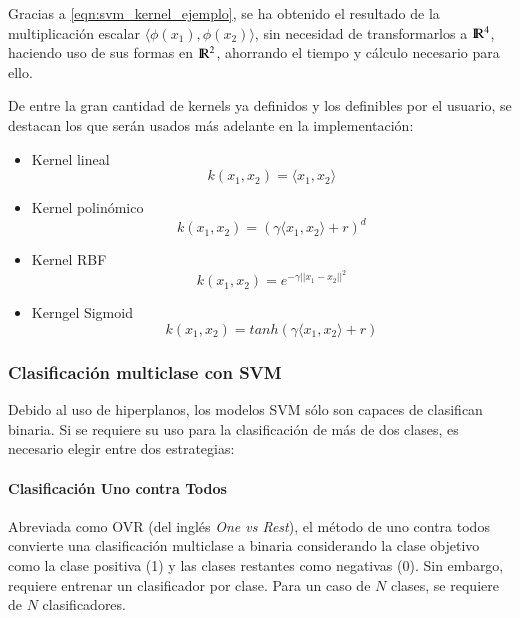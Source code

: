 Gracias a \ref{eqn:svm_kernel_ejemplo}, se ha obtenido el resultado de la multiplicación escalar $\langle \phi(x_{1}),\phi(x_{2})\rangle$, sin necesidad de transformarlos a $\rm I\!R^{4}$, haciendo uso de sus formas en $\rm I\!R^{2}$, ahorrando el tiempo y cálculo necesario para ello.

De entre la gran cantidad de kernels ya definidos y los definibles por el usuario, se destacan los que serán usados más adelante en la implementación:

\begin{itemize}
	\item Kernel lineal 
		\begin{equation}
			k(x_{1},x_{2}) = \langle x_{1},x_{2}\rangle
			\label{eqn:svm_kernel_lineal}
		\end{equation}	
	\item Kernel polinómico 
		\begin{equation}
			k(x_{1},x_{2}) = (\gamma\langle x_{1},x_{2}\rangle+r)^{d}
			\label{eqn:svm_kernel_poly}
		\end{equation}
	\item Kernel RBF
		\begin{equation}
			k(x_{1},x_{2}) = e^{-\gamma||x_{1}-x_{2}||^{2}}
			\label{eqn:svm_kernel_rbf}
		\end{equation}
	\item Kerngel Sigmoid 
		\begin{equation}
			k(x_{1},x_{2}) = tanh(\gamma\langle x_{1},x_{2}\rangle+r)
			\label{eqn:svm_kernel_sigmoid}
		\end{equation}
\end{itemize}

\subsubsection{Clasificación multiclase con SVM}

Debido al uso de hiperplanos, los modelos SVM sólo son capaces de clasifican binaria. Si se requiere su uso para la clasificación de más de dos clases, es necesario elegir entre dos estrategias:

\paragraph{Clasificación Uno contra Todos} \label{par:OVR}

Abreviada como OVR (del inglés \textit{One vs Rest}), el método de uno contra todos convierte una clasificación multiclase a binaria considerando la clase objetivo como la clase positiva (1) y las clases restantes como negativas (0). Sin embargo, requiere entrenar un clasificador por clase. Para un caso de $N$ clases, se requiere de $N$ clasificadores.

